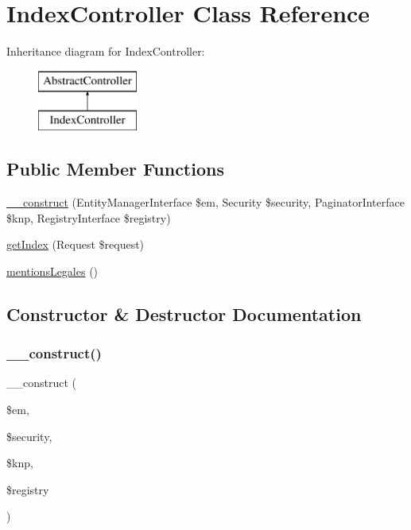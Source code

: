 \hypertarget{class_app_1_1_controller_1_1_index_controller}{}\section{Index\+Controller Class Reference}
\label{class_app_1_1_controller_1_1_index_controller}
Inheritance diagram for Index\+Controller\+:\begin{figure}[H]
\begin{center}
\leavevmode
\includegraphics[height=2.000000cm]{class_app_1_1_controller_1_1_index_controller}
\end{center}
\end{figure}
\subsection*{Public Member Functions}
\begin{DoxyCompactItemize}
\item 
\mbox{\hyperlink{class_app_1_1_controller_1_1_index_controller_a88cd2b8b18c1b00c241005a29c2b2153}{\+\_\+\+\_\+construct}} (Entity\+Manager\+Interface \$em, Security \$security, Paginator\+Interface \$knp, Registry\+Interface \$registry)
\item 
\mbox{\hyperlink{class_app_1_1_controller_1_1_index_controller_a407044381d414671dae5186605593832}{get\+Index}} (Request \$request)
\item 
\mbox{\hyperlink{class_app_1_1_controller_1_1_index_controller_a1a684edc761d7fe92be51e13a38f962b}{mentions\+Legales}} ()
\end{DoxyCompactItemize}


\subsection{Constructor \& Destructor Documentation}
\mbox{\label{class_app_1_1_controller_1_1_index_controller_a88cd2b8b18c1b00c241005a29c2b2153}} 
\subsubsection{\texorpdfstring{\_\_construct()}{\_\_construct()}}
{\footnotesize\ttfamily \+\_\+\+\_\+construct (\begin{DoxyParamCaption}\item[{Entity\+Manager\+Interface}]{\$em,  }\item[{Security}]{\$security,  }\item[{Paginator\+Interface}]{\$knp,  }\item[{Registry\+Interface}]{\$registry }\end{DoxyParamCaption})}

